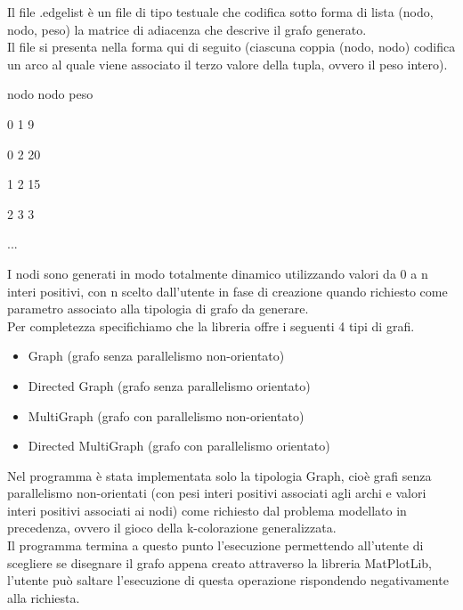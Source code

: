 Il file .edgelist è un file di tipo testuale che codifica sotto forma di lista (nodo, nodo, peso) la matrice di adiacenza che descrive il grafo generato.\\
Il file si presenta nella forma qui di seguito (ciascuna coppia (nodo, nodo) codifica un arco al quale viene associato il terzo valore della tupla, ovvero il peso intero).\\

\begin{description}
	\item nodo nodo peso
	\item 0    1    9
	\item 0    2    20
	\item 1    2    15
	\item 2    3    3
	\item ...
\end{description}

I nodi sono generati in modo totalmente dinamico utilizzando valori da 0 a n interi positivi, con n scelto dall'utente in fase di creazione quando richiesto come parametro associato alla tipologia di grafo da generare.\\

Per completezza specifichiamo che la libreria offre i seguenti 4 tipi di grafi.

\begin{itemize}
	\item Graph (grafo senza parallelismo non-orientato)
	\item Directed Graph (grafo senza parallelismo orientato)
	\item MultiGraph (grafo con parallelismo non-orientato)
	\item Directed MultiGraph (grafo con parallelismo orientato)
\end{itemize}

Nel programma è stata implementata solo la tipologia Graph, cioè grafi senza parallelismo non-orientati (con pesi interi positivi associati agli archi e valori interi positivi associati ai nodi) come richiesto dal problema modellato in precedenza, ovvero il gioco della k-colorazione generalizzata.\\

Il programma termina a questo punto l'esecuzione permettendo all'utente di scegliere se disegnare il grafo appena creato attraverso la libreria MatPlotLib, l'utente può saltare l'esecuzione di questa operazione rispondendo negativamente alla richiesta.\\

